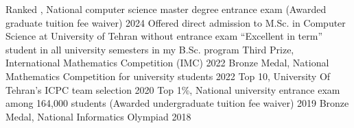 \vspace{-15pt}

\vspace{-4pt}
\begin{cvhonors}
  \cvhonor
  {Ranked ,}
  {National computer science master degree entrance exam (Awarded graduate tuition fee waiver)}
  {}
  {2024}
  \cvhonor
  {}
  {Offered direct admission to M.Sc. in Computer Science at University of Tehran without entrance exam}
  {}
  {\bullet}
  \cvhonor
  {}
  {``Excellent in term'' student in all university semesters in my B.Sc. program}
  {}
  {\bullet}
  \cvhonor
  {Third Prize,}
  {International Mathematics Competition (IMC)}
  {}
  {2022}
  \cvhonor
  {Bronze Medal,}
  {National Mathematics Competition for university students}
  {}
  {2022}
  \cvhonor
  {Top 10,}
  {University Of Tehran’s ICPC team selection}
  {}
  {2020}
  \cvhonor
  {Top 1\%,}
  {National university entrance exam among 164,000 students (Awarded undergraduate tuition fee waiver)}
  {}
  {2019}
  \cvhonor
  {Bronze Medal,}
  {National Informatics Olympiad}
  {}
  {2018}
\end{cvhonors}
